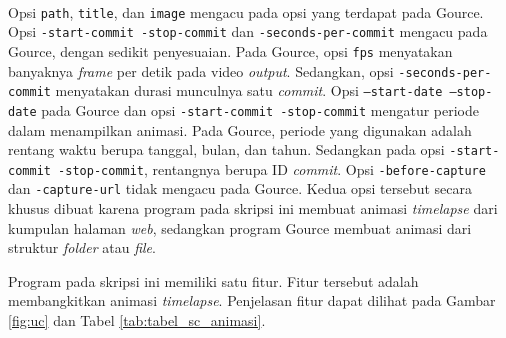 \ \\
Opsi \texttt{path}, \texttt{title}, dan \texttt{image} mengacu pada opsi yang terdapat pada Gource. Opsi \texttt{-start-commit -stop-commit} dan \texttt{-seconds-per-commit} mengacu pada Gource, dengan sedikit penyesuaian. Pada Gource, opsi \texttt{fps} menyatakan banyaknya \textit{frame} per detik pada video \textit{output}. Sedangkan, opsi \texttt{-seconds-per-commit} menyatakan durasi munculnya satu \textit{commit}. Opsi \texttt{--start-date --stop-date} pada Gource dan opsi \texttt{-start-commit -stop-commit} mengatur periode dalam menampilkan animasi. Pada Gource, periode yang digunakan adalah rentang waktu berupa tanggal, bulan, dan tahun. Sedangkan pada opsi \texttt{-start-commit -stop-commit}, rentangnya berupa ID \textit{commit}. Opsi \texttt{-before-capture} dan \texttt{-capture-url} tidak mengacu pada Gource. Kedua opsi tersebut secara khusus dibuat karena program pada skripsi ini membuat animasi \textit{timelapse} dari kumpulan halaman \textit{web}, sedangkan program Gource membuat animasi dari struktur \textit{folder} atau \textit{file}.           
 
 
Program pada skripsi ini memiliki satu fitur. Fitur tersebut adalah membangkitkan animasi \textit{timelapse}.
Penjelasan fitur dapat dilihat pada Gambar \ref{fig:uc} dan Tabel \ref{tab:tabel_sc_animasi}.



